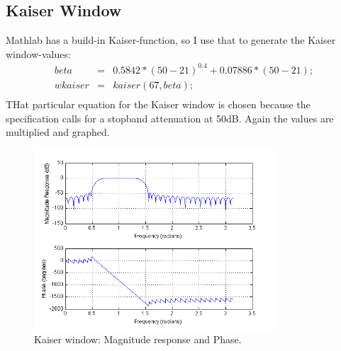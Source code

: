 \documentclass[a4wide,10pt]{article}
\begin{document}
		\subsection{Kaiser Window} %
		\label{sub:kaiser_window}
		Mathlab has a build-in Kaiser-function, so I use that to generate the Kaiser window-values:
		\begin{eqnarray}
			beta &=& 0.5842*(50-21)^{0.4}+0.07886*(50-21); \nonumber \\
			wkaiser &=& kaiser(67, beta); \nonumber \\
		\end{eqnarray}
		THat particular equation for the Kaiser window is chosen because the specification calls for a stopband attenuation at 50dB.
		Again the values are multiplied and graphed.
		\begin{figure}[h]
			\centering
				\includegraphics[width=9cm]{images/opgave_2_c.png}
			\caption{Kaiser window: Magnitude response and Phase.}
			\label{fig:images_opgave_2_c}
		\end{figure}
		
	
\end{document}
